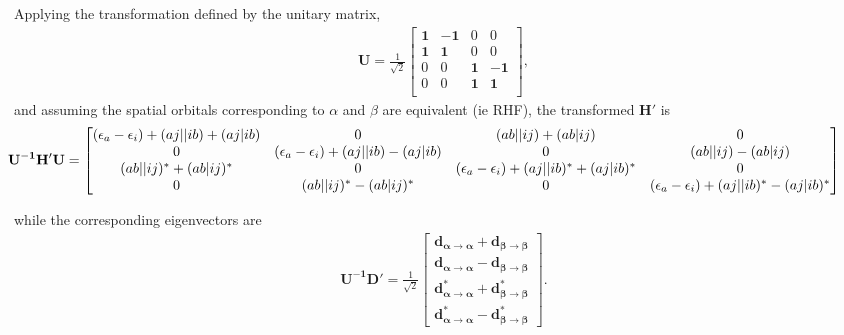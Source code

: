 \documentclass{revtex4}
\newcommand{\Ap}{\textcolor{myred}{\left(aj|ib\right)}}
\newcommand{\Aa}{\textcolor{myred}{\left(aj||ib\right)}}
\newcommand{\B}{\textcolor{myblue}{\left(ab|ij\right)}}
\newcommand{\Ba}{\textcolor{myblue}{\left(ab||ij\right)}}
\newcommand{\AtoA}{\mathbf{\alpha\rightarrow\alpha}}
\newcommand{\BtoB}{\mathbf{\beta\rightarrow\beta}}
\newcommand{\e}{\textcolor{myred}{\left(\epsilon_a-\epsilon_i\right)}}
\begin{document}
Applying the transformation defined by the unitary matrix, 
\begin{eqnarray}
  \mathbf{U} = \frac{1}{\sqrt{2}} 
  \begin{bmatrix}
    \mathbf{1} & -\mathbf{1} & 0 &  0 \\
    \mathbf{1} &  \mathbf{1} & 0 &  0 \\
    0 &  0 & \mathbf{1} & -\mathbf{1} \\
    0 &  0 & \mathbf{1} &  \mathbf{1} \\
  \end{bmatrix},
\end{eqnarray}
and assuming the spatial orbitals corresponding to $\alpha$ and $\beta$ are equivalent (ie RHF), 
the transformed $\mathbf{H}'$ is
\begin{eqnarray*}
  \hspace{-1cm}
  \mathbf{U^{-1}H'U} =
  \begin{bmatrix}
    \e + \Aa + \Ap & 0              & \Ba + \B            & 0            \\
    0                    & \e + \Aa - \Ap    & 0                & \Ba - \B              \\
    \Ba^* + \B^*         & 0                & \e+ \Aa^* + \Ap^*   & 0                     \\
    0                    & \Ba^* - \B^*     & 0                 & \e+ \Aa^* - \Ap^*  \\
  \end{bmatrix}
\end{eqnarray*}

while the corresponding eigenvectors are 
\begin{eqnarray*}
  \mathbf{U^{-1}D'} = \frac{1}{\sqrt{2}}
  \begin{bmatrix}
    \mathbf{d_\AtoA + d_\BtoB} \\
    \mathbf{d_\AtoA - d_\BtoB} \\
    \mathbf{d^*_\AtoA + d^*_\BtoB} \\        
    \mathbf{d^*_\AtoA - d^*_\BtoB} 
  \end{bmatrix}.
\end{eqnarray*}
\end{document}
